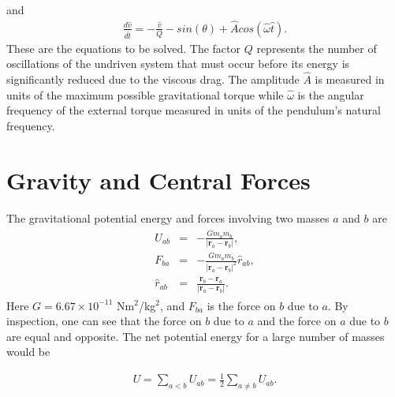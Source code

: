 \documentclass[letterpaper,10pt,english]{sphinxmanual}
\begin{document}
and
\begin{equation*}
\begin{split}
\frac{d\hat{v}}{d\hat{t}}=-\frac{\hat{v}}{Q}-sin(\theta)+\hat{A}cos(\hat{\omega}\hat{t}).
\end{split}
\end{equation*}
These are the equations to be solved.  The factor \(Q\) represents the
number of oscillations of the undriven system that must occur before
its energy is significantly reduced due to the viscous drag. The
amplitude \(\hat{A}\) is measured in units of the maximum possible
gravitational torque while \(\hat{\omega}\) is the angular frequency of
the external torque measured in units of the pendulum’s natural
frequency.


\chapter{Gravity and Central Forces}
\label{\detokenize{chapter1:gravity-and-central-forces}}
The gravitational potential energy and forces involving two masses \(a\) and \(b\) are
\begin{equation*}
\begin{split}
\begin{eqnarray}
U_{ab}&=&-\frac{Gm_am_b}{|\boldsymbol{r}_a-\boldsymbol{r}_b|},\\
\nonumber
F_{ba}&=&-\frac{Gm_am_b}{|\boldsymbol{r}_a-\boldsymbol{r}_b|^2}\hat{r}_{ab},\\
\nonumber
\hat{r}_{ab}&=&\frac{\boldsymbol{r}_b-\boldsymbol{r}_a}{|\boldsymbol{r}_a-\boldsymbol{r}_b|}.
\end{eqnarray}
\end{split}
\end{equation*}
Here \(G=6.67\times 10^{-11}\) Nm\(^2\)/kg\(^2\), and \(F_{ba}\) is the force
on \(b\) due to \(a\). By inspection, one can see that the force on \(b\)
due to \(a\) and the force on \(a\) due to \(b\) are equal and opposite. The
net potential energy for a large number of masses would be




\begin{equation*}
\begin{split}
\begin{equation}
U=\sum_{a<b}U_{ab}=\frac{1}{2}\sum_{a\ne b}U_{ab}.
\label{_auto73} \tag{97}
\end{equation}
\end{split}
\end{equation*}
\end{document}
